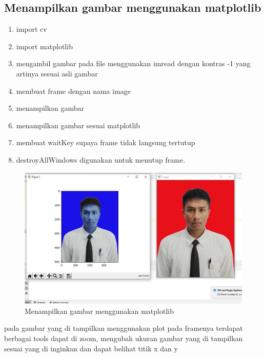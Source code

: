 \newpage
\subsection{Menampilkan gambar menggunakan matplotlib}

\begin{enumerate}
	\item import cv
	\item import matplotlib
	\item mengambil gambar pada file menggunakan imread dengan kontras -1 yang artinya sesuai asli gambar
	\item membuat frame dengan nama image
	\item menampilkan gambar
	\item menampilkan gambar sesuai matplotlib
	\item membuat waitKey supaya frame tidak langsung tertutup
	\item destroyAllWindows digunakan untuk menutup frame.
\end{enumerate}

\newpage
\begin{figure}[ht]
\centering
\includegraphics[scale=0.45]{figures/2,46,3.jpg}
\caption{Menampilkan gambar menggunakan matplotlib}
\label{contoh}
\end{figure}
pada gambar yang di tampilkan menggunakan plot pada framenya terdapat berbagai tools dapat di zoom, mengubah ukuran gambar yang di tampilkan sesuai yang di inginkan dan dapat belihat titik x dan y





\newpage

